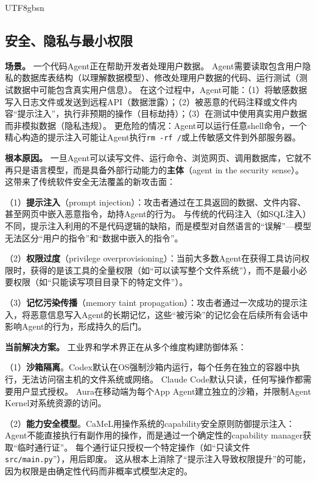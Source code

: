 \documentclass[11pt,a4paper]{article}
\begin{document}
\begin{CJK*}{UTF8}{gbsn}
\subsection{安全、隐私与最小权限}

\textbf{场景。}
一个代码Agent正在帮助开发者处理用户数据。
Agent需要读取包含用户隐私的数据库表结构（以理解数据模型）、修改处理用户数据的代码、运行测试（测试数据中可能包含真实用户信息）。
在这个过程中，Agent可能：（1）将敏感数据写入日志文件或发送到远程API（数据泄露）；（2）被恶意的代码注释或文件内容``提示注入''，执行非预期的操作（目标劫持）；（3）在测试中使用真实用户数据而非模拟数据（隐私违规）。
更危险的情况：Agent可以运行任意shell命令，一个精心构造的提示注入可能让Agent执行\texttt{rm -rf /}或上传敏感文件到外部服务器。

\textbf{根本原因。}
一旦Agent可以读写文件、运行命令、浏览网页、调用数据库，它就不再只是语言模型，而是具备外部行动能力的\textbf{主体}（agent in the security sense）。
这带来了传统软件安全无法覆盖的新攻击面：

（1）\textbf{提示注入}（prompt injection）：攻击者通过在工具返回的数据、文件内容、甚至网页中嵌入恶意指令，劫持Agent的行为。
与传统的代码注入（如SQL注入）不同，提示注入利用的不是代码逻辑的缺陷，而是模型对自然语言的``误解''---模型无法区分``用户的指令''和``数据中嵌入的指令''\cite{debenedetti2025camel,owasp_agentic2026}。

（2）\textbf{权限过度}（privilege overprovisioning）：当前大多数Agent在获得工具访问权限时，获得的是该工具的全量权限（如``可以读写整个文件系统''），而不是最小必要权限（如``只能读写项目目录下的特定文件''）。

（3）\textbf{记忆污染传播}（memory taint propagation）：攻击者通过一次成功的提示注入，将恶意信息写入Agent的长期记忆，这些``被污染''的记忆会在后续所有会话中影响Agent的行为，形成持久的后门\cite{aura2025}。

\textbf{当前解决方案。}
工业界和学术界正在从多个维度构建防御体系：

（1）\textbf{沙箱隔离}。Codex默认在OS强制沙箱内运行，每个任务在独立的容器中执行，无法访问宿主机的文件系统或网络\cite{openai_codex_sandbox_2026}。
Claude Code默认只读，任何写操作都需要用户显式授权\cite{anthropic_claudecode_security_2026}。
Aura在移动端为每个App Agent建立独立的沙箱，并限制Agent Kernel对系统资源的访问\cite{aura2025}。

（2）\textbf{能力安全模型}。CaMeL\cite{debenedetti2025camel}用操作系统的capability安全原则防御提示注入：Agent不能直接执行有副作用的操作，而是通过一个确定性的capability manager获取``临时通行证''。
每个通行证只授权一个特定操作（如``只读文件\texttt{src/main.py}''），用后即废。
这从根本上消除了``提示注入导致权限提升''的可能，因为权限是由确定性代码而非概率式模型决定的。


\end{CJK*}
\end{document}
